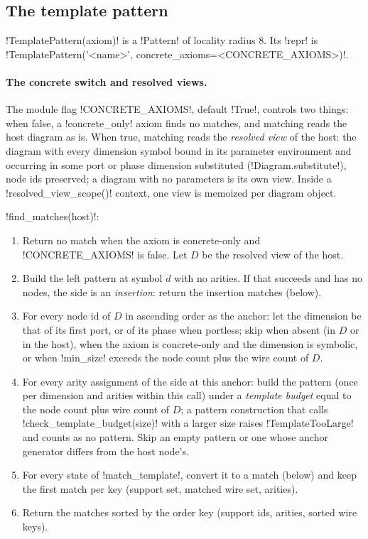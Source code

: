 \subsection{The template pattern}

\py!TemplatePattern(axiom)! is a \py!Pattern! of locality radius $8$. Its \py!repr! is
\code!TemplatePattern('<name>', concrete_axioms=<CONCRETE_AXIOMS>)!.

\paragraph{The concrete switch and resolved views.}
The module flag \py!CONCRETE_AXIOMS!, default \py!True!, controls two things: when false, a
\py!concrete_only! axiom finds no matches, and matching reads the host diagram as is. When true,
matching reads the \emph{resolved view} of the host: the diagram with every dimension symbol bound
in its parameter environment and occurring in some port or phase dimension substituted
(\py!Diagram.substitute!), node ids preserved; a diagram with no parameters is its own view.
Inside a \py!resolved_view_scope()! context, one view is memoized per diagram object.

\begin{algorithm}\label{alg:rewriting-templatefind}
\py!find_matches(host)!:
\begin{enumerate}
\item Return no match when the axiom is concrete-only and \py!CONCRETE_AXIOMS! is false. Let $D$
  be the resolved view of the host.
\item Build the left pattern at symbol $d$ with no arities. If that succeeds and has no nodes, the
  side is an \emph{insertion}: return the insertion matches (below).
\item For every node id of $D$ in ascending order as the anchor: let the dimension be that of its
  first port, or of its phase when portless; skip when absent (in $D$ or in the host), when the
  axiom is concrete-only and the dimension is symbolic, or when \py!min_size! exceeds the node count
  plus the wire count of $D$.
\item For every arity assignment of the side at this anchor: build the pattern (once per dimension
  and arities within this call) under a \emph{template budget} equal to the node count plus wire
  count of $D$; a pattern construction that calls \py!check_template_budget(size)! with a larger
  size raises \py!TemplateTooLarge! and counts as no pattern. Skip an empty pattern or one whose
  anchor generator differs from the host node's.
\item For every state of \py!match_template!, convert it to a match (below) and keep the first match
  per key (support set, matched wire set, arities).
\item Return the matches sorted by the order key (support ids, arities, sorted wire keys).
\end{enumerate}
\end{algorithm}


